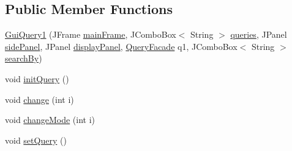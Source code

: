 \subsection*{Public Member Functions}
\begin{DoxyCompactItemize}
\item 
\hyperlink{classGuiQuery1_a8d4175f68c1145511607f64c24587f1c}{Gui\+Query1} (J\+Frame \hyperlink{classGUIQuery_aba988b5bec899d53480a472de7b87dfa}{main\+Frame}, J\+Combo\+Box$<$ String $>$ \hyperlink{classGUIQuery_a0db8bd960b4512cadf9aa40642934680}{queries}, J\+Panel \hyperlink{classGUIQuery_a70e233b1f14874166b7707edebe825d2}{side\+Panel}, J\+Panel \hyperlink{classGUIQuery_a8b4dbf257e0859c597591f072349b75c}{display\+Panel}, \hyperlink{classQueryFacade}{Query\+Facade} q1, J\+Combo\+Box$<$ String $>$ \hyperlink{classGuiQuery1_a021ae2f4fa2ec342496af6ac434995f4}{search\+By})
\item 
void \hyperlink{classGuiQuery1_a6159d6fe4b28473a93305c7f07405de9}{init\+Query} ()
\item 
void \hyperlink{classGuiQuery1_abe08121cbcebdc066aaec8400bc73cc7}{change} (int i)
\item 
void \hyperlink{classGuiQuery1_aa78daa5f76f85f27e3bbde79748bd34d}{change\+Mode} (int i)
\item 
void \hyperlink{classGuiQuery1_a9b24d0be68c88545f87a5a5bfb676cb2}{set\+Query} ()
\end{DoxyCompactItemize}
